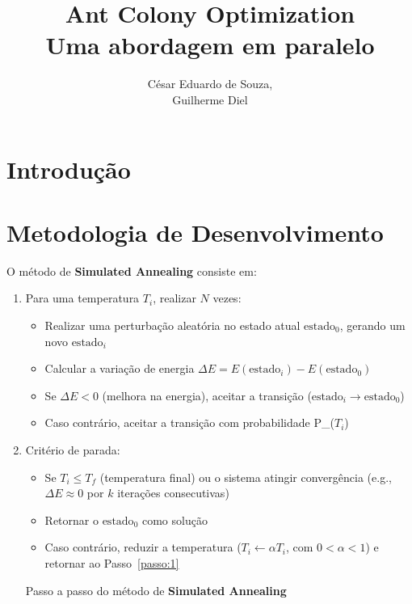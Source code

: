 \documentclass[12pt]{article}
\title{Ant Colony Optimization\\ Uma abordagem em paralelo}
\author{César Eduardo de Souza\inst{1},\\ Guilherme Diel\inst{1}}
\begin{document}
 

\maketitle

     
\begin{resumo} 
  
\end{resumo}


\section{Introdução}
\label{sec:introducao}



\section{Metodologia de Desenvolvimento}
\label{sec:metodologia_de_desenvolvimento}

O método de \textbf{Simulated Annealing} consiste em:
\begin{enumerate}
  
  \item Para uma temperatura $T_i$, realizar $N$ vezes: \label{passo:1}
  \begin{itemize}
    \item Realizar uma perturbação aleatória no estado atual $\text{estado}_0$, gerando um novo $\text{estado}_i$
    \item Calcular a variação de energia $\Delta E = E(\text{estado}_i) - E(\text{estado}_0)$
    \item Se $\Delta E < 0$ (melhora na energia), aceitar a transição ($\text{estado}_i \rightarrow \text{estado}_0$)
    \item Caso contrário, aceitar a transição com probabilidade P_{}($T_i$)
  \end{itemize}
  
  \item Critério de parada:
  \begin{itemize} \label{passo:2}
    \item Se $T_i \leq T_f$ (temperatura final) ou o sistema atingir convergência (e.g., $\Delta E \approx 0$ por $k$ iterações consecutivas)
    \item Retornar o $\text{estado}_0$ como solução
    \item Caso contrário, reduzir a temperatura ($T_i \leftarrow \alpha T_i$, com $0 < \alpha < 1$) e retornar ao Passo~\ref{passo:1}
  \end{itemize}
  \label{pseudocodigo}
  \caption{Passo a passo do método de \textbf{Simulated Annealing}}
\end{enumerate} 
\end{document}
